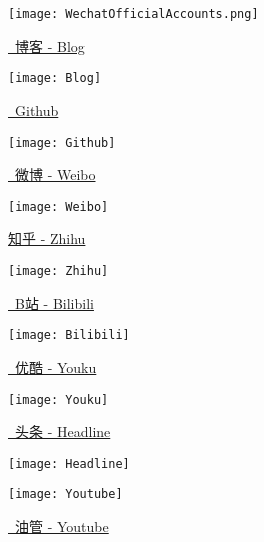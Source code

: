 \begin{figure}[h]
    \centering
    \texttt{[image: WechatOfficialAccounts.png]}
\end{figure}
\vspace*{-3ex}

\begin{figure}[h]
    \centering
    \begin{minipage}[t]{0.2\textwidth}
        \centering
        \caption*{\href{https://mister-kin.github.io}{\faBook\ 博客 - Blog}}
        \texttt{[image: Blog]}
    \end{minipage}
    \qquad
    \begin{minipage}[t]{0.2\textwidth}
        \centering
        \caption*{\href{https://github.com/mister-kin}{\faGithub\ Github}}
        \texttt{[image: Github]}
    \end{minipage}
    \qquad
    \begin{minipage}[t]{0.2\textwidth}
        \centering
        \caption*{\href{https://weibo.com/6270111192/profile?topnav=1&wvr=6&is_all=1}{\faWeibo\ 微博 - Weibo}}
        \texttt{[image: Weibo]}
    \end{minipage}
    \qquad
    \begin{minipage}[t]{0.2\textwidth}
        \centering
        \caption*{\href{https://www.zhihu.com/people/drwu-94}{知乎 - Zhihu}}
        \texttt{[image: Zhihu]}
    \end{minipage}

    \vspace*{2ex}

    \begin{minipage}[t]{0.2\textwidth}
        \centering
        \caption*{\href{http://space.bilibili.com/17025250?}{\faTv\ B站 - Bilibili}}
        \texttt{[image: Bilibili]}
    \end{minipage}
    \qquad
    \begin{minipage}[t]{0.2\textwidth}
        \centering
        \caption*{\href{http://i.youku.com/i/UNjA3MTk5Mjgw?spm=a2hzp.8253869.0.0}{\faChevronCircleRight\ 优酷 - Youku}}
        \texttt{[image: Youku]}
    \end{minipage}
    \qquad
    \begin{minipage}[t]{0.2\textwidth}
        \centering
        \caption*{\href{https://www.toutiao.com/c/user/835254071079053/\#mid=1663279303982091}{\faNewspaperO\ 头条 - Headline}}
        \texttt{[image: Headline]}
    \end{minipage}
    \qquad
    \begin{minipage}[t]{0.2\textwidth}
        \centering
        \caption*{\href{https://www.youtube.com/channel/UCXqjfWLzMlRKxGC8syWj17Q?view_as=public}{\faYoutubePlay\ 油管 - Youtube}}
        \texttt{[image: Youtube]}
    \end{minipage}
\end{figure}
